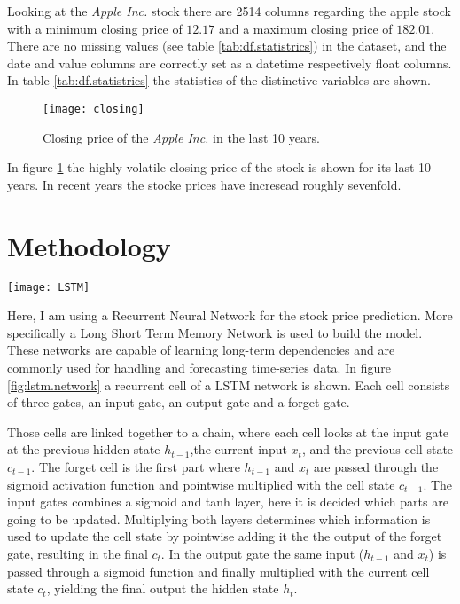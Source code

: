 \documentclass[fleqn,10pt]{SelfArx} %
\begin{document}
Looking at the \textit{Apple Inc.} stock there are 2514 columns regarding the apple stock with a minimum closing price of $12.17$ and a maximum closing price of $182.01$. There are no missing values (see table \ref{tab:df.statistrics}) in the dataset, and the date and value columns are correctly set as a datetime respectively float columns. In table \ref{tab:df.statistrics} the statistics of the distinctive variables are shown.

\begin{figure}[ht]\centering
	\texttt{[image: closing]}
	\caption{Closing price of the \textit{Apple Inc.} in the last 10 years.}
	\label{fig:results}
\end{figure}

In figure \ref{fig:results} the highly volatile closing price of the stock is shown for its last 10 years. In recent years the stocke prices have incresead roughly sevenfold. 





\section{Methodology}

\begin{figure*}[tb]\centering %
	\texttt{[image: LSTM]}
	\caption{The reccurent cell of a LSTM network \cite{LSTM}.}
	\label{fig:lstm.network}
\end{figure*}

Here, I am using a Recurrent Neural Network for the stock price prediction. More specifically a Long Short Term Memory Network is used to build the model. These networks are capable of learning long-term dependencies and are commonly used for handling and forecasting time-series data. In figure \ref{fig:lstm.network} a recurrent cell of a LSTM network is shown. Each cell consists of three gates, an input gate, an output gate and a forget gate. 

Those cells are linked together to a chain, where each cell looks at the input gate at the previous hidden state $h_{t-1}$,the current input $x_t$, and the previous cell state $c_{t-1}$. The forget cell is the first part where $h_{t-1}$ and $x_t$ are passed through the sigmoid activation function and pointwise multiplied with the cell state $c_{t-1}$. The input gates combines a sigmoid and tanh layer, here it is decided which parts are going to be updated. Multiplying both layers determines which information is used to update the cell state by pointwise adding it the the output of the forget gate, resulting in the final $c_t$.
In the output gate the same input ($h_{t-1}$ and $x_t$) is passed through a sigmoid function and finally multiplied with the current cell state $c_t$, yielding the final output the hidden state $h_t$.
\end{document}
